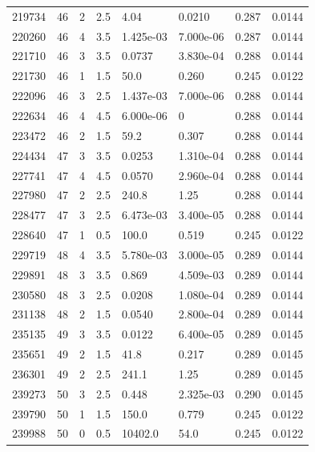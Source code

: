 \documentclass[preview]{standalone}
\begin{document}
{{{{{\begin{tabular}{L{1.2cm}C{1.2cm} C{0.3cm}C{0.5cm} C{1.4cm}C{1.4cm} C{1.4cm}C{1.4cm}}
  219734  &    46  & 2     & 2.5 &  4.04  & 0.0210  & 0.287 &  0.0144   \\ 
  220260  &    46  & 4     & 3.5 &  1.425e-03  & 7.000e-06  & 0.287 &  0.0144   \\ 
  221710  &    46  & 3     & 3.5 &  0.0737  & 3.830e-04  & 0.288 &  0.0144   \\ 
  221730  &    46  & 1     & 1.5 &  50.0  & 0.260  & 0.245 &  0.0122   \\ 
  222096  &    46  & 3     & 2.5 &  1.437e-03  & 7.000e-06  & 0.288 &  0.0144   \\ 
  222634  &    46  & 4     & 4.5 &  6.000e-06  & 0  & 0.288 &  0.0144   \\ 
  223472  &    46  & 2     & 1.5 &  59.2  & 0.307  & 0.288 &  0.0144   \\ 
  224434  &    47  & 3     & 3.5 &  0.0253  & 1.310e-04  & 0.288 &  0.0144   \\ 
  227741  &    47  & 4     & 4.5 &  0.0570  & 2.960e-04  & 0.288 &  0.0144   \\ 
  227980  &    47  & 2     & 2.5 &  240.8  & 1.25  & 0.288 &  0.0144   \\ 
  228477  &    47  & 3     & 2.5 &  6.473e-03  & 3.400e-05  & 0.288 &  0.0144   \\ 
  228640  &    47  & 1     & 0.5 &  100.0  & 0.519  & 0.245 &  0.0122   \\ 
  229719  &    48  & 4     & 3.5 &  5.780e-03  & 3.000e-05  & 0.289 &  0.0144   \\ 
  229891  &    48  & 3     & 3.5 &  0.869  & 4.509e-03  & 0.289 &  0.0144   \\ 
  230580  &    48  & 3     & 2.5 &  0.0208  & 1.080e-04  & 0.289 &  0.0144   \\ 
  231138  &    48  & 2     & 1.5 &  0.0540  & 2.800e-04  & 0.289 &  0.0144   \\ 
  235135  &    49  & 3     & 3.5 &  0.0122  & 6.400e-05  & 0.289 &  0.0145   \\ 
  235651  &    49  & 2     & 1.5 &  41.8  & 0.217  & 0.289 &  0.0145   \\ 
  236301  &    49  & 2     & 2.5 &  241.1  & 1.25  & 0.289 &  0.0145   \\ 
  239273  &    50  & 3     & 2.5 &  0.448  & 2.325e-03  & 0.290 &  0.0145   \\ 
  239790  &    50  & 1     & 1.5 &  150.0  & 0.779  & 0.245 &  0.0122   \\ 
  239988  &    50  & 0     & 0.5 &  10402.0  & 54.0  & 0.245 &  0.0122   \\ 

\end{tabular}}}}}}
\end{document}
